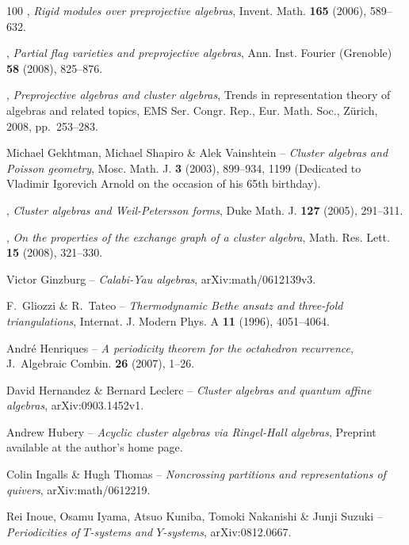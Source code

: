 \documentclass[brochure,12pt]{bourbaki}
\numberwithin{equation}{subsection}
\numberwithin{theorem}{section}
\begin{document}
\begin{thebibliography}{100}
\bysame, \emph{Rigid modules over preprojective algebras}, Invent. Math.
  \textbf{165} (2006), 589--632.

\bysame, \emph{Partial flag varieties and preprojective algebras}, Ann. Inst.
  Fourier (Grenoble) \textbf{58} (2008), 825--876.

\bysame, \emph{Preprojective algebras and cluster algebras}, Trends in
  representation theory of algebras and related topics, EMS Ser. Congr. Rep.,
  Eur. Math. Soc., Z\"urich, 2008, pp.~253--283.

{\sc Michael Gekhtman, Michael Shapiro \& Alek Vainshtein} -- 
\emph{Cluster algebras and {P}oisson geometry}, Mosc. Math. J.
  \textbf{3} (2003), 899--934, 1199 (Dedicated to Vladimir Igorevich
  Arnold on the occasion of his 65th birthday).

\bysame, \emph{Cluster algebras and {W}eil-{P}etersson forms}, Duke Math. J.
  \textbf{127} (2005), 291--311.

\bysame, \emph{On the properties of the exchange graph of a cluster algebra},
  Math. Res. Lett. \textbf{15} (2008), 321--330.

{\sc Victor Ginzburg} -- \emph{{Calabi-Yau} algebras}, arXiv:math/0612139v3.

{\sc F.~Gliozzi \& R.~Tateo} -- \emph{Thermodynamic {B}ethe ansatz and three-fold
  triangulations}, Internat. J. Modern Phys. A \textbf{11} (1996), 
  4051--4064.

{\sc Andr{\'e} Henriques} -- \emph{A periodicity theorem for the octahedron
  recurrence}, J.~Algebraic Combin. \textbf{26} (2007), 1--26.

{\sc David Hernandez \& Bernard Leclerc} -- \emph{Cluster algebras and quantum affine
  algebras}, arXiv:0903.1452v1.

{\sc Andrew Hubery} -- \emph{Acyclic cluster algebras via {R}ingel-{H}all algebras},
  Preprint available at the author's home page.

{\sc Colin Ingalls \& Hugh Thomas} -- \emph{Noncrossing partitions and representations
  of quivers}, arXiv:math/0612219.

{\sc Rei Inoue, Osamu Iyama, Atsuo Kuniba, Tomoki Nakanishi \& Junji Suzuki} --
  \emph{Periodicities of {$T$}-systems and {$Y$}-systems}, arXiv:0812.0667.



\end{thebibliography}
\end{document}
